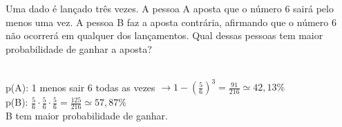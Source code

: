 \begin{ex}
    Uma dado é lançado três vezes. A pessoa A aposta que o número 6 sairá pelo menos uma vez. A pessoa B faz a aposta contrária,  afirmando que o número 6 não ocorrerá em qualquer dos lançamentos. Qual dessas pessoas tem maior probabilidade de ganhar a aposta?
      \begin{sol}
       \phantom{A} \\
       p(A):  1 menos sair 6 todas as vezes $\rightarrow 1-(\frac{5}{6})^3=\frac{91}{216}\simeq42,13\%$ \\
       p(B):   $\frac{5}{6}\cdot\frac{5}{6}\cdot\frac{5}{6}= \frac{125}{216}\simeq57,87\%$ \\
       B tem maior probabilidade de ganhar.
      \end{sol}
\end{ex}